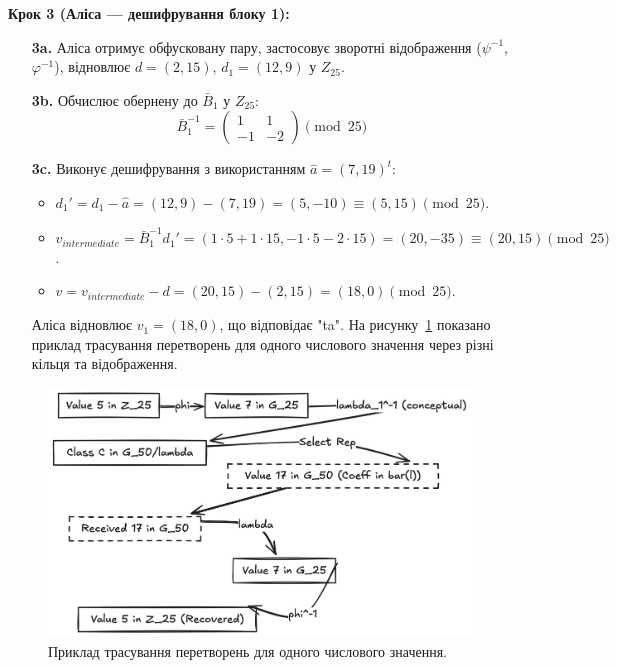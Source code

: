 \textbf{Крок 3 (Аліса — дешифрування блоку 1):}
\begin{itemize}
    \item[\textbf{3a.}] Аліса отримує обфусковану пару, застосовує зворотні відображення ($\psi^{-1}$, $\varphi^{-1}$), відновлює $d = (2, 15)$, $d_1 = (12, 9)$ у $Z_{25}$.
    \item[\textbf{3b.}] Обчислює обернену до $\bar{B}_1$ у $Z_{25}$:
    \[
        \bar{B}_1^{-1} = \begin{pmatrix}
                             1 & 1 \\ -1 & -2
        \end{pmatrix} \pmod{25}
    \]
    \item[\textbf{3c.}] Виконує дешифрування з використанням $\hat{a} = (7, 19)^t$:
    \begin{itemize}
        \item $d_1' = d_1 - \hat{a} = (12, 9) - (7, 19) = (5, -10) \equiv (5, 15) \pmod{25}$.
        \item $v_{intermediate} = \bar{B}_1^{-1} d_1' = (1 \cdot 5 + 1 \cdot 15, -1 \cdot 5 - 2 \cdot 15) = (20, -35) \equiv (20, 15) \pmod{25}$.
        \item $v = v_{intermediate} - d = (20, 15) - (2, 15) = (18, 0) \pmod{25}$.
    \end{itemize}
    Аліса відновлює $v_1 = (18, 0)$, що відповідає "ta".
    На рисунку~\ref{fig:data_trace_example} показано приклад трасування перетворень для одного числового значення через різні кільця та відображення.
\end{itemize}

\begin{figure}[ht]
    \centering
    \includegraphics[width=\textwidth]{pictures/Example Data Trace Diagram}
    \caption{Приклад трасування перетворень для одного числового значення.}
    \label{fig:data_trace_example}
\end{figure}

